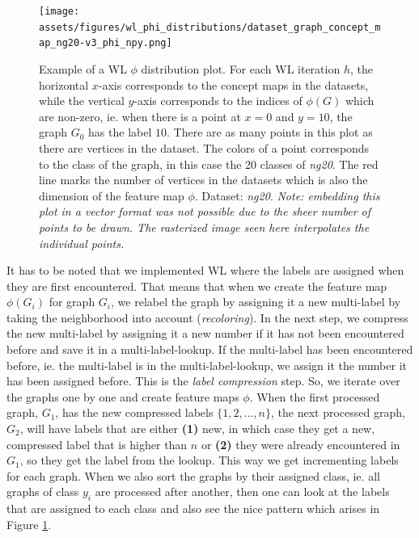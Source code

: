 \begin{figure}[htb!]
	\centering
	{\texttt{[image: assets/figures/wl\_phi\_distributions/dataset\_graph\_concept\_map\_ng20-v3\_phi\_npy.png]}
		\caption[Example: $\phi$ distribution plot]{%
			Example of a WL $\phi$ distribution plot.
			For each WL iteration $h$, the horizontal $x$-axis corresponds to the concept maps in the datasets, while the vertical $y$-axis corresponds to the indices of $\phi(G)$ which are non-zero, ie. when there is a point at $x=0$ and $y=10$, the graph $G_0$ has the label $10$.
			There are as many points in this plot as there are vertices in the dataset.
			The colors of a point corresponds to the class of the graph, in this case the 20 classes of \textit{ng20}.
			The red line marks the number of vertices in the datasets which is also the dimension of the feature map $\phi$.
			Dataset: \textit{ng20}.
			\textit{Note: embedding this plot in a vector format  was not possible due to the sheer number of points to be drawn. The rasterized image seen here interpolates the individual points.}
		}%
		\label{fig:phi_distribution_example}}
\end{figure}

It has to be noted that we implemented WL where the labels are assigned when they are first encountered. That means that when we create the feature map $\phi(G_i)$ for graph $G_i$, we relabel the graph by assigning it a new multi-label by taking the neighborhood into account (\textit{recoloring}). In the next step, we compress the new multi-label by assigning it a new number if it has not been encountered before and save it in a multi-label-lookup. If the multi-label has been encountered before, ie. the multi-label is in the multi-label-lookup, we assign it the number it has been assigned before.
This is the \textit{label compression} step.
So, we iterate over the graphs one by one and create feature maps $\phi$.
When the first processed graph, $G_1$, has the new compressed labels $\{1, 2, \ldots, n\}$, the next processed graph, $G_2$, will have labels that are either \textbf{(1)} new, in which case they get a new, compressed label that is higher than $n$ or \textbf{(2)} they were already encountered in $G_1$, so they get the label from the lookup.
This way we get incrementing labels for each graph.
When we also sort the graphs by their assigned class, ie. all graphs of class $y_i$ are processed after another, then one can look at the labels that are assigned to each class and also see the nice pattern which arises in Figure \ref{fig:phi_distribution_example}.

